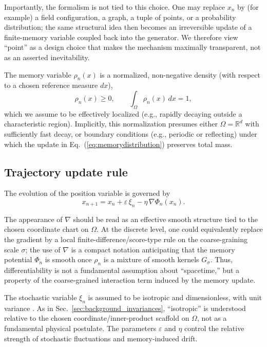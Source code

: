 \documentclass[reprint,amsmath,amssymb,aps,prd,nofootinbib,floatfix]{revtex4-2}
\begin{document}
Importantly, the formalism is not tied to this choice.
One may replace $x_n$ by (for example) a field configuration, a graph, a tuple of points, or a probability distribution; the same structural idea then becomes an irreversible update of a finite-memory variable coupled back into the generator.
We therefore view ``point'' as a design choice that makes the mechanism maximally transparent, not as an asserted inevitability.

The memory variable $\rho_n(x)$ is a normalized, non-negative density (with respect to a chosen reference measure $dx$),
\begin{equation}
\rho_n(x) \ge 0,
\qquad
\int_\Omega \rho_n(x)\,dx = 1,
\end{equation}
which we assume to be effectively localized (e.g., rapidly decaying outside a characteristic region). Implicitly, this normalization presumes either $\Omega=\mathbb{R}^d$ with sufficiently fast decay, or boundary conditions (e.g., periodic or reflecting) under which the update in Eq.~(\ref{eq:memorydistribution}) preserves total mass.

\subsection{Trajectory update rule}

The evolution of the position variable is governed by
\begin{equation}\label{eq:trajectory}
x_{n+1} = x_n + \varepsilon\,\xi_n - \eta\,\nabla\Phi_n(x_n).
\end{equation}

The appearance of $\nabla$ should be read as an effective smooth structure tied to the chosen coordinate chart on $\Omega$.
At the discrete level, one could equivalently replace the gradient by a local finite-difference/score-type rule on the coarse-graining scale $\sigma$; the use of $\nabla$ is a compact notation anticipating that the memory potential $\Phi_n$ is smooth once $\rho_n$ is a mixture of smooth kernels $G_\sigma$.
Thus, differentiability is not a fundamental assumption about ``spacetime,'' but a property of the coarse-grained interaction term induced by the memory update.

The stochastic variable $\xi_n$ is assumed to be isotropic and dimensionless, with unit variance \cite{Gardiner2009}. As in Sec.~\ref{sec:background_invariances}, ``isotropic'' is understood relative to the chosen coordinate/inner-product scaffold on $\Omega$, not as a fundamental physical postulate. The parameters $\varepsilon$ and $\eta$ control the relative strength of stochastic fluctuations and memory-induced drift.
\end{document}
